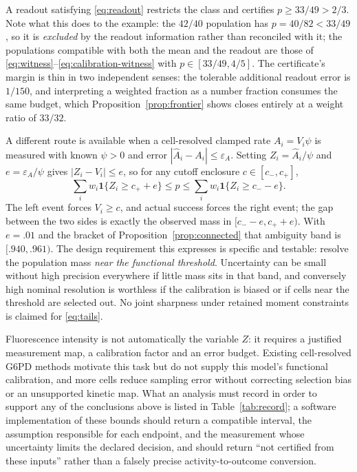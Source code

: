 \documentclass[11pt]{article}
\theoremstyle{definition}
\newcommand{\ind}{\mathbf 1}
\begin{document}
A readout satisfying \eqref{eq:readout} restricts the class and certifies
$p\ge33/49>2/3$. Note what this does to the example: the $42/40$ population has
$p=40/82<33/49$, so it is \emph{excluded} by the readout information rather
than reconciled with it; the populations compatible with both the mean and the
readout are those of \eqref{eq:witness}--\eqref{eq:calibration-witness} with
$p\in[33/49,4/5]$. The certificate's margin is thin in two independent senses:
the tolerable additional readout error is $1/150$, and interpreting a weighted
fraction as a number fraction consumes the same budget, which
Proposition~\ref{prop:frontier} shows closes entirely at a weight ratio of
$33/32$.

A different route is available when a cell-resolved clamped rate
$A_i=V_i\psi$ is measured with known $\psi>0$ and error
$|\widehat A_i-A_i|\le\varepsilon_A$. Setting $Z_i=\widehat A_i/\psi$ and
$e=\varepsilon_A/\psi$ gives $|Z_i-V_i|\le e$, so for any cutoff enclosure
$c\in[c_-,c_+]$,
\begin{equation}\label{eq:tails}
  \sum_iw_i\ind\{Z_i\ge c_++e\}\le p\le\sum_iw_i\ind\{Z_i\ge c_--e\}.
\end{equation}
The left event forces $V_i\ge c$, and actual success forces the right event;
the gap between the two sides is exactly the observed mass in
$[c_--e,c_++e)$. With $e=.01$ and the bracket of
Proposition~\ref{prop:connected} that ambiguity band is $[.940,.961)$. The
design requirement this expresses is specific and testable: resolve the
population mass \emph{near the functional threshold}. Uncertainty can be small
without high precision everywhere if little mass sits in that band, and
conversely high nominal resolution is worthless if the calibration is biased
or if cells near the threshold are selected out. No joint sharpness under
retained moment constraints is claimed for \eqref{eq:tails}.

Fluorescence intensity is not automatically the variable $Z$: it requires a
justified measurement map, a calibration factor and an error budget. Existing
cell-resolved G6PD methods \cite{shah,kalnoky} motivate this task but do not
supply this model's functional calibration, and more cells reduce sampling
error without correcting selection bias or an unsupported kinetic map. What an
analysis must record in order to support any of the conclusions above is
listed in Table~\ref{tab:record}; a software implementation of these bounds
should return a compatible interval, the assumption responsible for each
endpoint, and the measurement whose uncertainty limits the declared decision,
and should return ``not certified from these inputs'' rather than a falsely
precise activity-to-outcome conversion.
\end{document}
